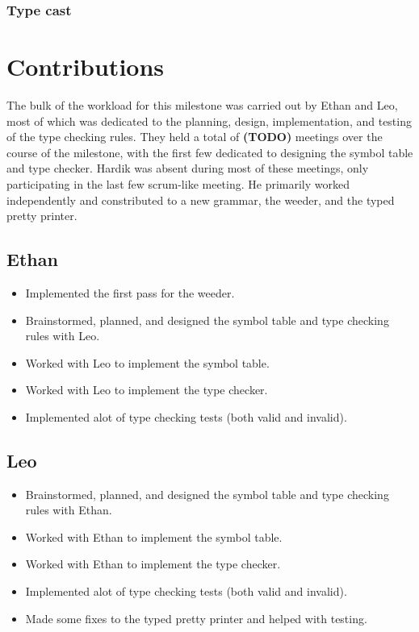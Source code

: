\documentclass{article}
\begin{document}
\subsubsection*{Type cast}

\section*{Contributions}

The bulk of the workload for this milestone was carried out by Ethan and Leo, most of which was dedicated to the planning, design, implementation, and testing of the type checking rules.
They held a total of \textbf{(TODO)} meetings over the course of the milestone, with the first few dedicated to designing the symbol table and type checker.
Hardik was absent during most of these meetings, only participating in the last few scrum-like meeting.
He primarily worked independently and constributed to a new grammar, the weeder, and the typed pretty printer.

\subsection*{Ethan}

\begin{itemize}
    \item Implemented the first pass for the weeder.
    \item Brainstormed, planned, and designed the symbol table and type checking rules with Leo.
    \item Worked with Leo to implement the symbol table.
    \item Worked with Leo to implement the type checker.
    \item Implemented alot of type checking tests (both valid and invalid).
\end{itemize}

\subsection*{Leo}

\begin{itemize}
    \item Brainstormed, planned, and designed the symbol table and type checking rules with Ethan.
    \item Worked with Ethan to implement the symbol table.
    \item Worked with Ethan to implement the type checker.
    \item Implemented alot of type checking tests (both valid and invalid).
    \item Made some fixes to the typed pretty printer and helped with testing.
\end{itemize}
\end{document}
